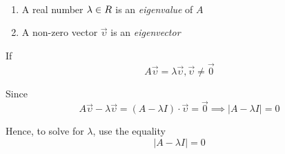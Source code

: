 \begin{definition}\ \\
    \begin{enumerate}
        \item A real number $\lambda \in \relax{R}$ is an \textit{eigenvalue} of $A$
        \item A non-zero vector $\overrightarrow{\upsilon}$ is an \textit{eigenvector}
    \end{enumerate}
    If
    \begin{equation}
        A \overrightarrow{\upsilon} = \lambda \overrightarrow{\upsilon}, \overrightarrow{\upsilon} \ne \overrightarrow{0}
    \end{equation}
    
    Since
    \begin{equation}
        A \overrightarrow{\upsilon} - \lambda \overrightarrow{\upsilon} = (A - \lambda I) \cdot \overrightarrow{\upsilon} = \overrightarrow{0} \implies \lvert A - \lambda I \rvert = 0
    \end{equation}
    
    Hence, to solve for $\lambda$, use the equality
    \begin{equation}
        \lvert A - \lambda I \rvert = 0
    \end{equation}
\end{definition}

